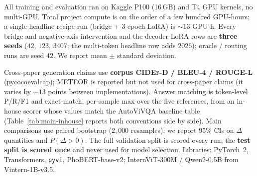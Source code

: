 All training and evaluation ran on Kaggle P100 (16\,GB) and T4 GPU kernels, no
multi-GPU. Total project compute is on the order of a few hundred GPU-hours; a
single headline recipe run (bridge $+$ 3-epoch LoRA) is ${\sim}13$ GPU-h. Every
bridge and negative-axis intervention and the decoder-LoRA rows are
\textbf{three seeds} ($42$, $123$, $3407$; the multi-token headline row adds
$2026$); oracle / routing runs are seed $42$. We report mean $\pm$ standard
deviation.

Cross-paper generation claims use \textbf{corpus CIDEr-D / BLEU-4 / ROUGE-L}
(pycocoevalcap); METEOR is reported but not used for cross-paper claims (it
varies by ${\sim}13$ points between implementations). Answer matching is
token-level P/R/F1 and exact-match, per-sample max over the five references, from
an in-house scorer whose values match the AutoViVQA baseline table
(Table~\ref{tab:main-inhouse} reports both conventions side by side). Main
comparisons use paired bootstrap ($2{,}000$ resamples); we report $95\%$ CIs on
$\Delta$ quantities and $P(\Delta > 0)$. The full validation split is scored
every run; the \textbf{test split is scored once} and never used for model
selection. Libraries: PyTorch~2, Transformers, \texttt{pyvi}, PhoBERT-base-v2;
InternViT-300M / Qwen2-0.5B from Vintern-1B-v3.5.

